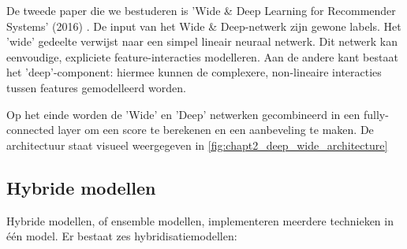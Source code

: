 
De tweede paper die we bestuderen is 'Wide \& Deep Learning for Recommender Systems' (2016) \cite{wide_deep_learning_paper}. De input van het Wide \& Deep-netwerk zijn gewone labels. Het 'wide' gedeelte verwijst naar een simpel lineair neuraal netwerk. Dit netwerk kan eenvoudige, expliciete feature-interacties modelleren. Aan de andere kant bestaat het 'deep'-component: hiermee kunnen de complexere, non-lineaire interacties tussen features gemodelleerd worden. 

Op het einde worden de 'Wide' en 'Deep' netwerken gecombineerd in een fully-connected layer om een score te berekenen en een aanbeveling te maken. De architectuur staat visueel weergegeven in \autoref{fig:chapt2_deep_wide_architecture}


\subsection{Hybride modellen}
\label{sec:chapt2_hybride_modellen}

Hybride modellen, of ensemble modellen, implementeren meerdere technieken in één model. Er bestaat zes hybridisatiemodellen:

